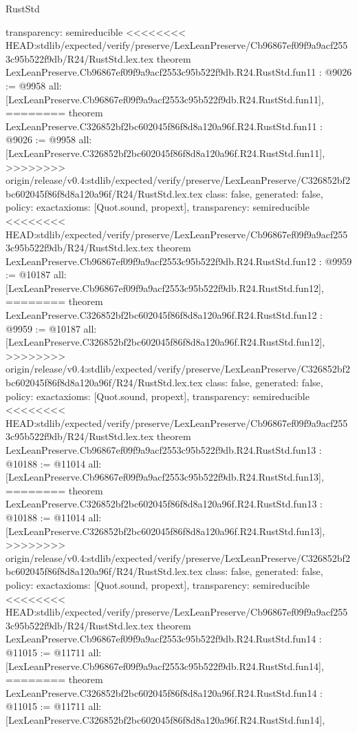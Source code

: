 \begin{lexlean}{RustStd}
\begin{coremodule}
{\begin{coremodule}
{{{{{{{{{{{{{{  transparency: semireducible
}
<<<<<<<< HEAD:stdlib/expected/verify/preserve/LexLeanPreserve/Cb96867ef09f9a9acf2553c95b522f9db/R24/RustStd.lex.tex
theorem LexLeanPreserve.Cb96867ef09f9a9acf2553c95b522f9db.R24.RustStd.fun11 : @9026 := @9958 {
  all: [LexLeanPreserve.Cb96867ef09f9a9acf2553c95b522f9db.R24.RustStd.fun11],
========
theorem LexLeanPreserve.C326852bf2bc602045f86f8d8a120a96f.R24.RustStd.fun11 : @9026 := @9958 {
  all: [LexLeanPreserve.C326852bf2bc602045f86f8d8a120a96f.R24.RustStd.fun11],
>>>>>>>> origin/release/v0.4:stdlib/expected/verify/preserve/LexLeanPreserve/C326852bf2bc602045f86f8d8a120a96f/R24/RustStd.lex.tex
  class: false,
  generated: false,
  policy: exact{axioms: [Quot.sound, propext]},
  transparency: semireducible
}
<<<<<<<< HEAD:stdlib/expected/verify/preserve/LexLeanPreserve/Cb96867ef09f9a9acf2553c95b522f9db/R24/RustStd.lex.tex
theorem LexLeanPreserve.Cb96867ef09f9a9acf2553c95b522f9db.R24.RustStd.fun12 : @9959 := @10187 {
  all: [LexLeanPreserve.Cb96867ef09f9a9acf2553c95b522f9db.R24.RustStd.fun12],
========
theorem LexLeanPreserve.C326852bf2bc602045f86f8d8a120a96f.R24.RustStd.fun12 : @9959 := @10187 {
  all: [LexLeanPreserve.C326852bf2bc602045f86f8d8a120a96f.R24.RustStd.fun12],
>>>>>>>> origin/release/v0.4:stdlib/expected/verify/preserve/LexLeanPreserve/C326852bf2bc602045f86f8d8a120a96f/R24/RustStd.lex.tex
  class: false,
  generated: false,
  policy: exact{axioms: [Quot.sound, propext]},
  transparency: semireducible
}
<<<<<<<< HEAD:stdlib/expected/verify/preserve/LexLeanPreserve/Cb96867ef09f9a9acf2553c95b522f9db/R24/RustStd.lex.tex
theorem LexLeanPreserve.Cb96867ef09f9a9acf2553c95b522f9db.R24.RustStd.fun13 : @10188 := @11014 {
  all: [LexLeanPreserve.Cb96867ef09f9a9acf2553c95b522f9db.R24.RustStd.fun13],
========
theorem LexLeanPreserve.C326852bf2bc602045f86f8d8a120a96f.R24.RustStd.fun13 : @10188 := @11014 {
  all: [LexLeanPreserve.C326852bf2bc602045f86f8d8a120a96f.R24.RustStd.fun13],
>>>>>>>> origin/release/v0.4:stdlib/expected/verify/preserve/LexLeanPreserve/C326852bf2bc602045f86f8d8a120a96f/R24/RustStd.lex.tex
  class: false,
  generated: false,
  policy: exact{axioms: [Quot.sound, propext]},
  transparency: semireducible
}
<<<<<<<< HEAD:stdlib/expected/verify/preserve/LexLeanPreserve/Cb96867ef09f9a9acf2553c95b522f9db/R24/RustStd.lex.tex
theorem LexLeanPreserve.Cb96867ef09f9a9acf2553c95b522f9db.R24.RustStd.fun14 : @11015 := @11711 {
  all: [LexLeanPreserve.Cb96867ef09f9a9acf2553c95b522f9db.R24.RustStd.fun14],
========
theorem LexLeanPreserve.C326852bf2bc602045f86f8d8a120a96f.R24.RustStd.fun14 : @11015 := @11711 {
  all: [LexLeanPreserve.C326852bf2bc602045f86f8d8a120a96f.R24.RustStd.fun14],
}}}}}}}}}}}}}}}}}}
\end{coremodule}}
\end{coremodule}
\end{lexlean}
